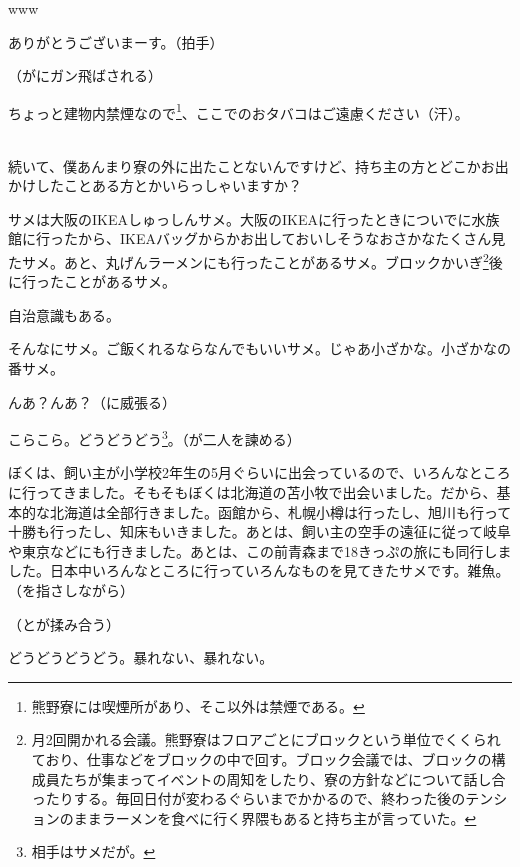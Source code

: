 \documentclass[9pt,4aj]{jsarticle}
\begin{document}
\begin{multicols}{2}
www

ありがとうございまーす。（拍手）

（がにガン飛ばされる）

ちょっと建物内禁煙なので\footnote{熊野寮には喫煙所があり、そこ以外は禁煙である。}、ここでのおタバコはご遠慮ください（汗）。

\\
続いて、僕あんまり寮の外に出たことないんですけど、持ち主の方とどこかお出かけしたことある方とかいらっしゃいますか？

サメは大阪のIKEAしゅっしんサメ。大阪のIKEAに行ったときについでに水族館に行ったから、IKEAバッグからかお出しておいしそうなおさかなたくさん見たサメ。あと、丸げんラーメンにも行ったことがあるサメ。ブロックかいぎ\footnote{月2回開かれる会議。熊野寮はフロアごとにブロックという単位でくくられており、仕事などをブロックの中で回す。ブロック会議では、ブロックの構成員たちが集まってイベントの周知をしたり、寮の方針などについて話し合ったりする。毎回日付が変わるぐらいまでかかるので、終わった後のテンションのままラーメンを食べに行く界隈もあると持ち主が言っていた。}後に行ったことがあるサメ。

自治意識もある。

そんなにサメ。ご飯くれるならなんでもいいサメ。じゃあ小ざかな。小ざかなの番サメ。

んあ？んあ？（に威張る）

こらこら。どうどうどう\footnote{相手はサメだが。}。（が二人を諫める）

ぼくは、飼い主が小学校2年生の5月ぐらいに出会っているので、いろんなところに行ってきました。そもそもぼくは北海道の苫小牧で出会いました。だから、基本的な北海道は全部行きました。函館から、札幌小樽は行ったし、旭川も行って十勝も行ったし、知床もいきました。あとは、飼い主の空手の遠征に従って岐阜や東京などにも行きました。あとは、この前青森まで18きっぷの旅にも同行しました。日本中いろんなところに行っていろんなものを見てきたサメです。雑魚。（を指さしながら）

（とが揉み合う）

どうどうどうどう。暴れない、暴れない。


\end{multicols}
\end{document}
